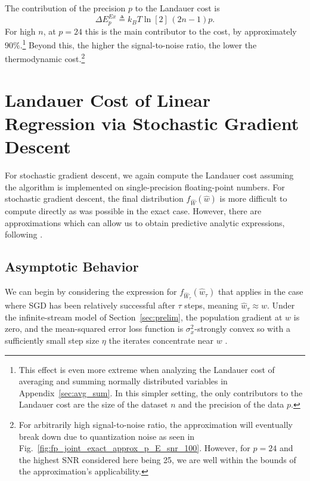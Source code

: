 \documentclass[12pt,onecolumn, margin=1in]{IEEEtran}
\newcommand{\Wh}{\hat{W}}
\newcommand{\wh}{\hat{w}}
\begin{document}
The contribution of the precision $p$ to the Landauer cost is
\begin{equation}
    \label{eq:precision_contribution_Ex}
    \Delta E^{Ex}_{p} \triangleq k_BT \ln[2]\,(2n - 1)p.
\end{equation}
For high $n$, at $p=24$ this is the main contributor to the cost, by approximately $90\%$.\footnote{This effect is even more extreme when analyzing the Landauer cost of averaging and summing normally distributed variables in Appendix~\ref{sec:avg_sum}. In this simpler setting, the only contributors to the Landauer cost are the size of the dataset $n$ and the precision of the data $p$.} Beyond this, the higher the signal-to-noise ratio, the lower the thermodynamic cost.\footnote{For arbitrarily high signal-to-noise ratio, the approximation will eventually break down due to quantization noise as seen in Fig.~\ref{fig:fp_joint_exact_approx_p_E_snr_100}. However, for $p=24$ and the highest SNR considered here being 25, we are well within the bounds of the approximation's applicability.}

     



\section{Landauer Cost of Linear Regression via Stochastic Gradient Descent}\label{sec:sgd}

For stochastic gradient descent, we again compute the Landauer cost assuming the algorithm is implemented on single-precision floating-point numbers. For stochastic gradient descent, the final distribution $f_{\Wh}(\wh)$ is more difficult to compute directly as was possible in the exact case. However, there are approximations which can allow us to obtain predictive analytic expressions, following \cite{MandtSGDBayes, MandtSGDVariational, Jastrzebski2017ThreeFI}. 

\subsection{Asymptotic Behavior}\label{sec:stationarysgd}

We can begin by considering the expression for $f_{\Wh_\tau}(\hat w_\tau)$ that applies in the case where SGD has been relatively successful after $\tau$ steps, meaning $\hat w_\tau \approx w$. Under the infinite-stream model of Section~\ref{sec:prelim}, the population gradient at $w$ is zero, and the mean-squared error loss function is $\sigma_x^2$-strongly convex so with a sufficiently small step size $\eta$ the iterates concentrate near $w$ \cite{bottou2018optimization}.
\end{document}
